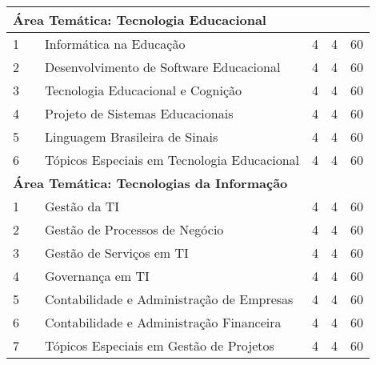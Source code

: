 \documentclass[
	12pt,				%
	openright,			%
  oneside,     %
	a4paper,			%
	english,			%
	french,				%
	spanish,			%
	brazil				%
	]{abntex2}
\begin{document}
\begin{apendicesenv}
\begin{longtable}{r|r|l|r|r|r}
\multicolumn{6}{l}{\textbf{Área Temática: Tecnologia Educacional}} \\ \hline
    1     &       & Informática na Educação & 4     & 4     & 60 \\ \hline
    2     &       & Desenvolvimento de Software Educacional & 4     & 4     & 60 \\ \hline
    3     &       & Tecnologia Educacional e Cognição & 4     & 4     & 60 \\ \hline
    4     &       & Projeto de Sistemas Educacionais & 4     & 4     & 60 \\ \hline
    5     &       & Linguagem Brasileira de Sinais & 4     & 4     & 60 \\ \hline
    6     &       & \small{Tópicos Especiais em Tecnologia Educacional} & 4     & 4     & 60 \\ \hline

\multicolumn{6}{l}{\textbf{Área Temática: Tecnologias da Informação}} \\ \hline
    1     &       & Gestão da TI & 4     & 4     & 60 \\ \hline
    2     &       & Gestão de Processos de Negócio & 4     & 4     & 60 \\ \hline
    3     &       & Gestão de Serviços em TI & 4     & 4     & 60 \\ \hline
    4     &       & Governança em TI & 4     & 4     & 60 \\ \hline
    5     &       & Contabilidade e Administração de Empresas & 4     & 4     & 60 \\ \hline
    6     &       & Contabilidade e Administração Financeira & 4     & 4     & 60 \\ \hline
    7     &       & \small{Tópicos Especiais em Gestão de Projetos} & 4     & 4     & 60 \\ \hline


    \end{longtable}%




\begin{landscape}


\end{landscape}
\end{apendicesenv}
\end{document}
